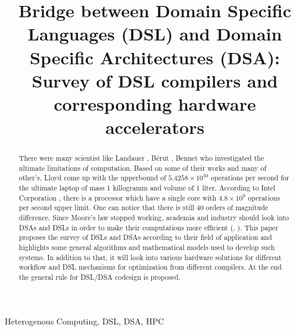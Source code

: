 \documentclass[conference]{IEEEtran}
\begin{document}
\title{Bridge between Domain Specific Languages (DSL) and Domain Specific Architectures (DSA): Survey of DSL compilers and corresponding hardware accelerators}

\author{
}


\maketitle

\begin{abstract}
There were many scientist like Landauer \cite{ref22}, B{\'e}rut \cite{ref23}, Bennet \cite{ref24} who investigated the ultimate limitations of computation. Based on some of their works and many of other's, Lloyd \cite{ref17} come up with the upperbound of $5.4258 \times 10^{50}$ operations per second for the ultimate laptop of mass 1 killogramm and volume of 1 liter. According to Intel Corporation \cite{ref25}, there is a processor which have a single core with  $4.8 \times 10^{9}$ operations per second upper limit. One can notice that there is still 40 orders of magnitude difference. Since Moore's law stopped working, academia and industry should look into DSAs and DSLs in order to make their computations more efficient (\cite{ref20}, \cite{ref21}). This paper proposes the survey of DSLs and DSAs according to their field of application and highlights some general algorithms and mathematical models used to develop such systems. In addition to that, it will look into various hardware solutions for different workflow and DSL mechanisms for optimization from different compilers. At the end the general rule for DSL/DSA codesign is proposed.  
\end{abstract}

\begin{IEEEkeywords}
Heterogenous Computing, DSL, DSA, HPC
\end{IEEEkeywords}
\end{document}
